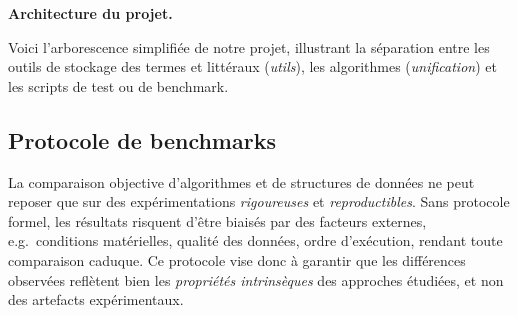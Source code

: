 \documentclass[11pt]{article}
\newenvironment{paraph}[1]{%
  \medskip
  \noindent\textbf{#1.}\quad

  \vspace{0.2cm}
}{%
  \medskip
}
\begin{document}
\begin{paraph}{Architecture du projet}
    Voici l'arborescence simplifiée de notre projet, illustrant la séparation entre les outils de stockage des termes et littéraux (\textit{utils}), les algorithmes (\textit{unification}) et les scripts de test ou de benchmark. 
\end{paraph}

\subsection{Protocole de benchmarks}

La comparaison objective d'algorithmes et de structures de données 
ne peut reposer que sur des expérimentations \textit{rigoureuses} 
et \textit{reproductibles}. Sans protocole formel, les résultats 
risquent d'être biaisés par des facteurs externes, e.g.~conditions 
matérielles, qualité des données, ordre d'exécution, rendant 
toute comparaison caduque. Ce protocole vise donc à garantir que 
les différences observées reflètent bien les \textit{propriétés 
intrinsèques} des approches étudiées, et non des artefacts 
expérimentaux.
\end{document}
